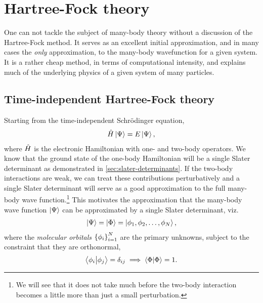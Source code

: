 \chapter{Hartree-Fock theory}
    \label{chap:hf}
    One can not tackle the subject of many-body theory without a discussion of
    the Hartree-Fock method. It serves as an excellent initial approximation,
    and in many cases the \emph{only} approximation, to the many-body
    wavefunction for a given system. It is a rather cheap method, in terms of
    computational intensity, and explains much of the underlying physics of a
    given system of many particles.

    \section{Time-independent Hartree-Fock theory}
        Starting from the time-independent Schrödinger equation,
        \begin{align}
            \hat{H}\ket{\Psi} = E\ket{\Psi},
        \end{align}
        where $\hat{H}$ is the electronic Hamiltonian with one- and two-body
        operators.
        We know that the ground state of the one-body Hamiltonian will be a
        single Slater determinant as demonstrated in
        \autoref{sec:slater-determinants}.
        If the two-body interactions are weak, we can treat these contributions
        perturbatively and a single Slater determinant will serve as a good
        approximation to the full many-body wave function.\footnote{%
            We will see that it does not take much before the two-body
            interaction becomes a little more than just a small perturbation.
        }
        This motivates the approximation that the many-body wave function
        $\ket{\Psi}$ can be approximated by a single Slater determinant, viz.
        \begin{align}
            \ket{\Psi} = \ket{\Phi} = \ket{\phi_1, \phi_2, \dots, \phi_N},
        \end{align}
        where the \emph{molecular orbitals} $\left\{ \phi_i \right\}_{i = 1}^{N}$ are the
        primary unknowns, subject to the constraint that they are orthonormal,
        \begin{align}
            \braket{\phi_i}{\phi_j} = \delta_{ij}
            \implies
            \braket{\Phi} = 1.
        \end{align}

